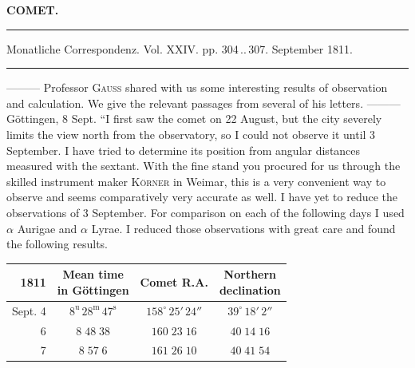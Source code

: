 \clearpage{}\hypertarget{native-340-lower}{}\label{native-340-lower}
\begin{center}\textbf{COMET.}\par\vspace{4pt}\hrule\vspace{4pt}\fontsize{10}{12}\selectfont Monatliche Correspondenz. Vol. XXIV. pp. 304\,..\,307. September 1811.\par\vspace{4pt}\hrule\vspace{4pt}\end{center}

\par\indent ---\;---\;--- Professor \textsc{Gauss} shared with us some interesting results of observation and calculation. We give the relevant passages from several of his letters. ---\;---\;--- Göttingen, 8 Sept. “I first saw the comet on 22 August, but the city severely limits the view north from the observatory, so I could not observe it until 3 September. I have tried to determine its position from angular distances measured with the sextant. With the fine stand you procured for us through the skilled instrument maker \textsc{Körner} in Weimar, this is a very convenient way to observe and seems comparatively very accurate as well. I have yet to reduce the observations of 3 September. For comparison on each of the following days I used $\alpha$ Aurigae and $\alpha$ Lyrae. I reduced those observations with great care and found the following results.
\begin{center}\fontsize{10}{12}\selectfont\setlength{\tabcolsep}{4pt}\renewcommand{\arraystretch}{1.15}\begin{tabular}{r|c|c|c}
1811 & \shortstack{Mean time\\in Göttingen} & Comet R.A. & \shortstack{Northern\\declination}\\\hline
Sept. 4 & $8^{\mathrm u}\,28^{\mathrm m}\,47^{\mathrm s}$ & $158^\circ\,25'\,24''$ & $39^\circ\,18'\,2''$\\
6 & $8\;48\;38$ & $160\;23\;16$ & $40\;14\;16$\\
7 & $8\;57\;6$ & $161\;26\;10$ & $40\;41\;54$\\
\end{tabular}\end{center}

